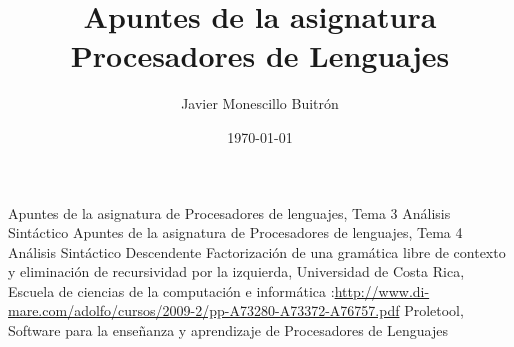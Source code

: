 \documentclass[a4paper,12pt]{book}
\begin{document}
\author{Javier Monescillo Buitrón}
\title{Apuntes de la asignatura Procesadores de Lenguajes}
\date{\today}

\frontmatter
\maketitle
\tableofcontents


\mainmatter






\backmatter

\begin{thebibliography}{99}
	 Apuntes de la asignatura de Procesadores de lenguajes, Tema 3 Análisis Sintáctico
	 Apuntes de la asignatura de Procesadores de lenguajes, Tema 4 Análisis Sintáctico Descendente
	 Factorización de una gramática libre de contexto  y eliminación de recursividad por la izquierda, Universidad de Costa Rica, Escuela de ciencias de la computación e informática :\url{http://www.di-mare.com/adolfo/cursos/2009-2/pp-A73280-A73372-A76757.pdf}
	 Proletool, Software para la enseñanza y aprendizaje de Procesadores de Lenguajes
	
\end{thebibliography}
\end{document}
